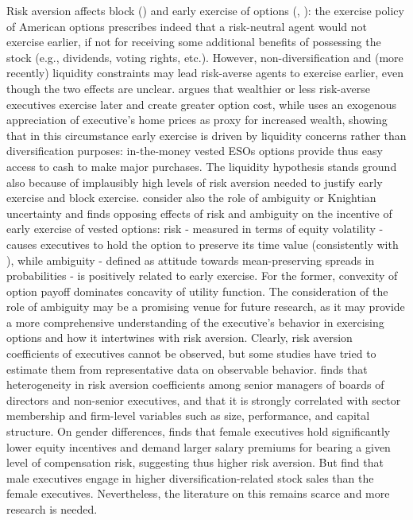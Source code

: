     Risk aversion affects block (\cite{grasselli2009risk}) and early exercise of options (\cite{izhakian2017risk}, \cite{murphy2019employees}): the exercise policy of American options prescribes indeed that a risk-neutral agent would not exercise earlier, if not for receiving some additional benefits of possessing the stock (e.g., dividends, voting rights, etc.). However, non-diversification and (more recently) liquidity constraints may lead risk-averse agents to exercise earlier, even though the two effects are unclear. \cite{carpenter2010optimal} argues that wealthier or less risk-averse executives exercise later and create greater option cost, while \cite{murphy2019employees} uses an exogenous appreciation of executive's home prices as proxy for increased wealth, showing that in this circumstance early exercise is driven by liquidity concerns rather than diversification purposes: in-the-money vested ESOs options provide thus easy access to cash to make major purchases. The liquidity hypothesis stands ground also because of implausibly high levels of risk aversion needed to justify early exercise and block exercise. 
    \cite{izhakian2017risk} consider also the role of ambiguity or Knightian uncertainty and finds opposing effects of risk and ambiguity on the incentive of early exercise of vested options: risk - measured in terms of equity volatility - causes executives to hold the option to preserve its time value (consistently with \cite{heron2017stock}), while ambiguity - defined as attitude towards mean-preserving spreads in probabilities - is positively related to early exercise. For the former, convexity of option payoff dominates concavity of utility function. The consideration of the role of ambiguity may be a promising venue for future research, as it may provide a more comprehensive understanding of the executive's behavior in exercising options and how it intertwines with risk aversion.
    Clearly, risk aversion coefficients of executives cannot be observed, but some studies have tried to estimate them from representative data on observable behavior. \cite{brenner2015risk} finds that heterogeneity in risk aversion coefficients among senior managers of boards of directors and non-senior executives, and that it is strongly correlated  with sector membership and firm-level variables such as size, performance, and capital structure. On gender differences, \cite{carter2017executive} finds that female executives hold significantly lower equity incentives and demand larger salary premiums for bearing a given level of compensation risk, suggesting thus higher risk aversion. But \cite{iqbal2006female} find that male executives engage in higher diversification-related stock sales than the female executives. Nevertheless, the literature on this remains scarce and more research is needed.

